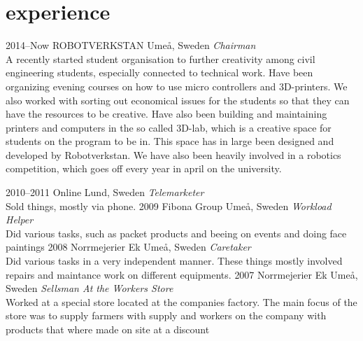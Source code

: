 \documentclass[]{friggeri-cv} %
\begin{document}

\section{experience}

\begin{entrylist}
\entry
{2014--Now}
{ROBOTVERKSTAN}
{Umeå, Sweden}
{\emph{Chairman} \\
A recently started student organisation to further creativity among civil engineering students, especially connected to technical work. Have been organizing evening courses on how to use micro controllers and 3D-printers. We also worked with sorting out economical issues for the students so that they can have the resources to be creative. Have also been building and maintaining printers and computers in the so called 3D-lab, which is a creative space for students on the program to be in. This space has in large been designed and developed by Robotverkstan. We have also been heavily involved in a robotics competition, which goes off every year in april on the university.}

\entry
{2010--2011}
{Online}
{Lund, Sweden}
{\emph{Telemarketer} \\
Sold things, mostly via phone.}
\entry
{2009}
{Fibona Group}
{Umeå, Sweden}
{\emph{Workload Helper} \\
Did various tasks, such as packet products and beeing on events and doing face paintings}
\entry
{2008}
{Norrmejerier Ek}
{Umeå, Sweden}
{\emph{Caretaker} \\
Did various tasks in a very independent manner. These things mostly involved repairs and maintance work on different equipments.}
\entry
{2007}
{Norrmejerier Ek}
{Umeå, Sweden}
{\emph{Sellsman At the Workers Store} \\
Worked at a special store located at the companies factory. The main focus of the store was to supply farmers with supply and workers on the company with products that where made on site at a discount}
\end{entrylist}

\end{document}
